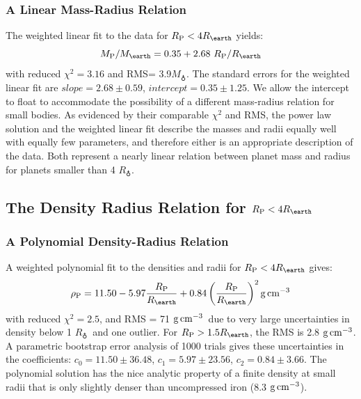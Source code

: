 \documentclass[iop]{emulateapj}
\newcommand{\gcmc}{\ensuremath{\rm g\,cm^{-3}}}
\newcommand{\gcc}{\gcmc}
\newcommand{\rpl}{\ensuremath{R_{\rm P}}}
\newcommand{\mpl}{\ensuremath{M_{\rm P}}}
\newcommand{\rhopl}{\ensuremath{\rho_{\rm P}}}
\newcommand{\rearth}{\ensuremath{R_\earth}}
\newcommand{\mearth}{\ensuremath{M_\earth}}
\newcommand{\rspecial}{4 \rearth}
\begin{document}
\subsubsection{A Linear Mass-Radius Relation}
The weighted linear fit to the data for $\rpl < \rspecial$ yields:
\begin{equation}
\mpl/\mearth = 0.35 + 2.68~\rpl/\rearth
\label{eqn:mr_linear}
\end{equation}
with reduced $\chi^2=3.16$ and RMS= 3.9\mearth.  The standard errors for the weighted linear fit are $slope = 2.68 \pm 0.59$, $intercept= 0.35\pm1.25$.  We allow the intercept to float to accommodate the possibility of a different mass-radius relation for small bodies.  As evidenced by their comparable $\chi^2$ and RMS, the power law solution and the weighted linear fit describe the masses and radii equally well with equally few parameters, and therefore either is an appropriate description of the data. Both represent a nearly linear relation between planet mass and radius for planets smaller than 4 \rearth.

\subsection{The Density Radius Relation for $\rpl < \rspecial$}
\subsubsection{A Polynomial Density-Radius Relation}
A weighted polynomial fit to the densities and radii for $\rpl < \rspecial$ gives:
\begin{equation}
\rhopl = 11.50 - 5.97 \frac{\rpl}{\rearth} + 0.84 \left(\frac{\rpl}{\rearth}\right)^{2} \gcc
\label{eqn:dr_poly}
\end{equation}
with reduced $\chi^2=2.5$, and RMS = 71 \gcc\ due to very large uncertainties in density below 1 \rearth\ and one outlier.  For $\rpl > 1.5 \rearth$, the RMS is 2.8 \gcc.  A parametric bootstrap error analysis of 1000 trials gives these uncertainties in the coefficients: $c_0 =11.50 \pm 36.48$, $c_1 = 5.97 \pm 23.56$, $c_2 = 0.84\pm3.66$.   The polynomial solution has the nice analytic property of a finite density at small radii that is only slightly denser than uncompressed iron (8.3 \gcc).
\end{document}
